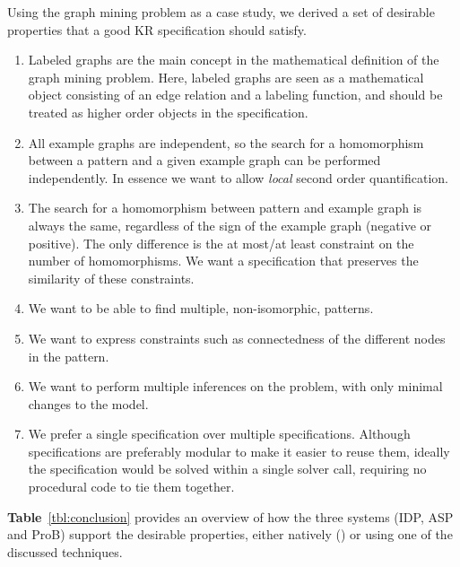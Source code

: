 Using the graph mining problem as a case study, we derived a set of desirable properties that a good KR specification should satisfy.

\begin{enumerate}[itemsep=0mm]
\item Labeled graphs are the main concept in the mathematical definition of the graph mining problem. 
Here, labeled graphs are seen as a mathematical object consisting of an edge relation and a labeling function, and should be treated as higher order objects in the specification.
\item All example graphs are independent, so the search for a homomorphism between a pattern and a given example graph can be performed independently. 
In essence we want to allow \emph{local} second order quantification.  %
\item The search for a homomorphism between pattern and example graph is always the same, regardless of the sign of the example graph (negative or positive). The only difference is the at most/at least constraint on the number of homomorphisms.
We want a specification that preserves the similarity of these constraints.
\item We want to be able to find multiple, non-isomorphic, patterns.
\item We want to express constraints such as connectedness of the different nodes in the pattern.
\item We want to perform multiple inferences on the problem, with only minimal changes to the model.
\item We prefer a single specification over multiple specifications. 
Although specifications are preferably modular to make it easier to reuse them, ideally the specification would be solved within a single solver call, requiring no procedural code to tie them together.
\end{enumerate}
\textbf{Table}~\ref{tbl:conclusion} provides an overview of how the three systems (IDP, ASP and ProB) support the desirable properties, either natively (\checkmark) or using one of the discussed techniques.
